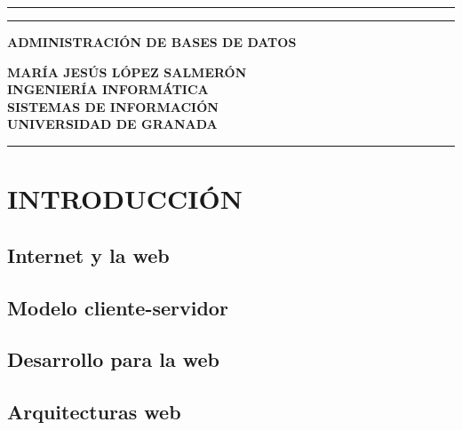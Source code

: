 \documentclass{article}
\newcommand{\titulo}{ADMINISTRACIÓN DE BASES DE DATOS}
\newcommand{\autor}{MARÍA JESÚS LÓPEZ SALMERÓN}
\newcommand{\universidad}{UNIVERSIDAD DE GRANADA}
\newcommand{\carrera}{INGENIERÍA INFORMÁTICA}
\newcommand{\especialidad}{SISTEMAS DE INFORMACIÓN}
\begin{document}
\pagestyle{empty}
\setlength{\parindent}{0pt}


\centering

\vspace*{\fill}
\rule{\textwidth}{5pt}\vspace{-5pt}
\rule{\textwidth}{1.3pt}\vspace{12pt}

\Huge\bf\titulo

\vspace{50pt}

\LARGE\bf\autor\\
\vspace{30pt}
\large\carrera\\\especialidad\\\universidad\\

\vspace{6pt}\rule{\textwidth}{1.3pt}

\vspace*{\fill}
\vspace*{\fill}

\flushleft

\newpage



\newpage
 
\section{INTRODUCCIÓN}
\subsection{Internet y la web}
\subsection{Modelo cliente-servidor}
\subsection{Desarrollo para la web}
\subsection{Arquitecturas web}


\newpage
\end{document}
